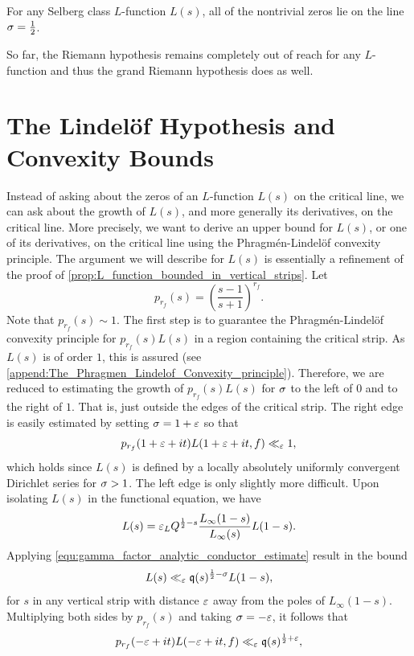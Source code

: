 \documentclass[12pt]{article}
\begin{document}
    \begin{conjecture*}
      For any Selberg class \(L\)-function \(L(s)\), all of the nontrivial zeros lie on the line \(\sigma = \frac{1}{2}\).
    \end{conjecture*}

    So far, the Riemann hypothesis remains completely out of reach for any \(L\)-function and thus the grand Riemann hypothesis does as well.
  \section{The Lindel\"of Hypothesis and Convexity Bounds}
    Instead of asking about the zeros of an \(L\)-function \(L(s)\) on the critical line, we can ask about the growth of \(L(s)\), and more generally its derivatives, on the critical line. More precisely, we want to derive an upper bound for \(L(s)\), or one of its derivatives, on the critical line using the Phragm\'en-Lindel\"of convexity principle. The argument we will describe for \(L(s)\) is essentially a refinement of the proof of \cref{prop:L_function_bounded_in_vertical_strips}. Let
    \[
      p_{r_{f}}(s) = \left(\frac{s-1}{s+1}\right)^{r_{f}}.
    \]
    Note that \(p_{r_{f}}(s) \sim 1\). The first step is to guarantee the Phragm\'en-Lindel\"of convexity principle for \(p_{r_{f}}(s)L(s)\) in a region containing the critical strip. As \(L(s)\) is of order \(1\), this is assured (see \cref{append:The_Phragmen_Lindelof_Convexity_principle}). Therefore, we are reduced to estimating the growth of \(p_{r_{f}}(s)L(s)\) for \(\sigma\) to the left of \(0\) and to the right of \(1\). That is, just outside the edges of the critical strip. The right edge is easily estimated by setting \(\sigma = 1+\varepsilon\) so that
    \[
      p_{r_{f}}(1+\varepsilon+it)L(1+\varepsilon+it,f) \ll_{\varepsilon} 1,
    \]
    which holds since \(L(s)\) is defined by a locally absolutely uniformly convergent Dirichlet series for \(\sigma > 1\). The left edge is only slightly more difficult. Upon isolating \(L(s)\) in the functional equation, we have
    \[
      L(s) = \varepsilon_{L}Q^{\frac{1}{2}-s}\frac{L_{\infty}(1-s)}{L_{\infty}(s)}L(1-s).
    \]
    Applying \cref{equ:gamma_factor_analytic_conductor_estimate} result in the bound
    \[
      L(s) \ll_{\varepsilon} \mathfrak{q}(s)^{\frac{1}{2}-\sigma}L(1-s),
    \]
    for \(s\) in any vertical strip with distance \(\varepsilon\) away from the poles of \(L_{\infty}(1-s)\). Multiplying both sides by \(p_{r_{f}}(s)\) and taking \(\sigma = -\varepsilon\), it follows that
    \[
      p_{r_{f}}(-\varepsilon+it)L(-\varepsilon+it,f) \ll_{\varepsilon} \mathfrak{q}(s)^{\frac{1}{2}+\varepsilon},
    \]
\end{document}
